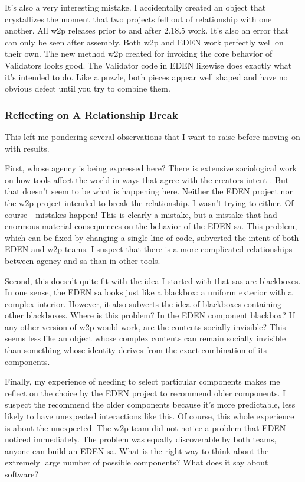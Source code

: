 \documentclass[a4paper,man,natbib,floatsintext]{apa6}
\begin{document}
  It's also a very interesting mistake. I accidentally created an object that crystallizes the moment that two projects fell out of relationship with one another. All \gls{w2p} releases prior to and after 2.18.5 work. It's also an error that can only be seen after assembly. Both \gls{w2p} and \gls{EDEN} work perfectly well on their own. The new method \gls{w2p} created for invoking the core behavior of Validators looks good. The Validator code in \gls{EDEN} likewise does exactly what it's intended to do. Like a puzzle, both pieces appear well shaped and have no obvious defect until you try to combine them.

  \subsubsection{Reflecting on A Relationship Break}
  This left me pondering several observations that I want to raise before moving on with results.

  First, whose agency is being expressed here? There is extensive sociological work on how tools affect the world in ways that agree with the creators intent \citep{Mackenzie2006-hb,Subramaniam2014-wg}. But that doesn't seem to be what is happening here. Neither the \gls{EDEN} project nor the \gls{w2p} project intended to break the relationship. I wasn't trying to either. Of course - mistakes happen! This is clearly a mistake, but a mistake that had enormous material consequences on the behavior of the \gls{EDEN} \gls{sa}. This problem, which can be fixed by changing a single line of code, subverted the intent of both \gls{EDEN} and \gls{w2p} teams. I suspect that there is a more complicated relationships between agency and \gls{sa} than in other tools.

  Second, this doesn't quite fit with the idea I started with that \glspl{sa} are blackboxes. In one sense, the \gls{EDEN} \gls{sa} looks just like a blackbox: a uniform exterior with a complex interior. However, it also subverts the idea of blackboxes containing other blackboxes. Where is this problem? In the \gls{EDEN} component blackbox? If any other version of \gls{w2p} would work, are the contents socially invisible? This seems less like an object whose complex contents can remain socially invisible than something whose identity derives from the exact combination of its components.

  Finally, my experience of needing to select particular components makes me reflect on the choice by the \gls{EDEN} project to recommend older components. I suspect the recommend the older components because it's more predictable, less likely to have unexpected interactions like this. Of course, this whole experience is about the unexpected. The \gls{w2p} team did not notice a problem that \gls{EDEN} noticed immediately. The problem was equally discoverable by both teams, anyone can build an \gls{EDEN} \gls{sa}. What is the right way to think about the extremely large number of possible components? What does it say about software?
\end{document}
